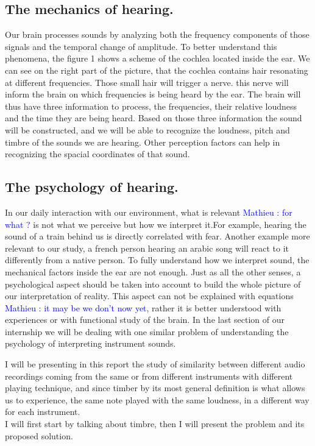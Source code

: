 \documentclass[hidelinks,12pt]{report}
\newcommand{\ml}[1]{\textcolor{blue}{ Mathieu : #1}}
\begin{document}
\subsection{The mechanics of hearing.}
Our brain processes sounds by analyzing both the frequency components of those signals and the temporal change of amplitude. To better understand this phenomena, the figure 1 shows a scheme of the cochlea located inside the ear. We can see on the right part of the picture, that the cochlea contains hair resonating  at different frequencies. Those small hair will trigger a nerve. this nerve will inform the brain on which frequencies is being heard by the ear. The brain will thus have three information to process, the frequencies, their relative loudness and the time they are being heard. Based on those three information the sound will be constructed, and we will be able to   
recognize the loudness, pitch and timbre of the sounds we are hearing. Other perception factors can help in recognizing the spacial coordinates   of that sound.

\subsection{The psychology of hearing.}

In our daily interaction with our environment, what is relevant \ml{for what ?} is not what we perceive but how we interpret it.For example, hearing the sound of a train behind us is directly correlated with fear. Another example more relevant to our study, a french person hearing an arabic song will react to it differently from a native person. To fully understand how we interpret sound, the mechanical factors inside the ear are not enough. Just as all the other senses, a psychological aspect should be taken into account to build the whole picture of our interpretation of reality. This aspect can not be explained with equations \ml{it may be we don't now yet}, rather it is better understood with experiences or with functional study of the brain. In the last section of our internship we will be dealing with one similar problem of understanding the psychology of interpreting instrument sounds.\par 


I will be presenting in this report the study of similarity between different audio recordings coming from the same or from different instruments with different playing technique, and since timber by its most general definition is what allows us to experience, the same note played with the same loudness, in a different way for each instrument.\\ I will first start by talking about  timbre, then I will present the problem and its proposed solution. 
\end{document}

